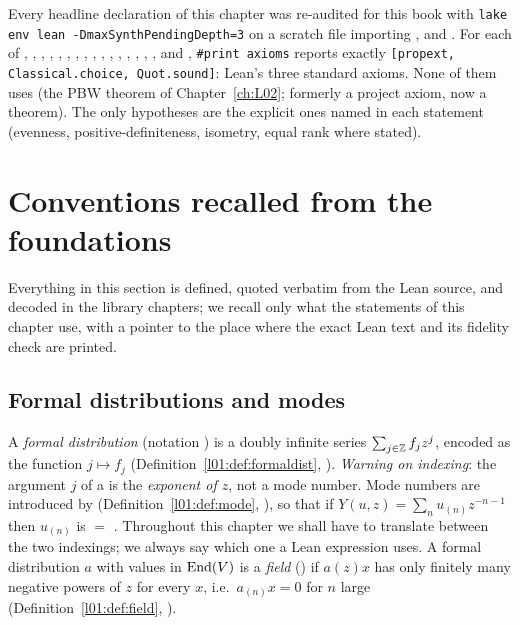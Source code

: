 \begin{status}
Every headline declaration of this chapter was re-audited for this book with
\texttt{lake env lean -DmaxSynthPendingDepth=3} on a scratch file importing
,  and
. For each of ,
, , ,
, , , ,
, , ,
, , ,
, ,  and
, \texttt{\#print axioms} reports exactly
\texttt{[propext, Classical.choice, Quot.sound]}: Lean's three standard axioms. None of them uses
 (the PBW theorem of Chapter~\ref{ch:L02}; formerly a project axiom, now a theorem). The only hypotheses are the explicit ones named in each
statement (evenness, positive-definiteness, isometry, equal rank where stated).
\end{status}

\section{Conventions recalled from the foundations}\label{ch03:sec:conventions}

Everything in this section is defined, quoted verbatim from the Lean source, and decoded in the
library chapters; we recall only what the statements of this chapter use, with a pointer to the
place where the exact Lean text and its fidelity check are printed.

\subsection{Formal distributions and modes}

A \emph{formal distribution}  (notation ) is a doubly infinite
series $\sum_{j\in{\mathbb{Z}}}f_jz^j$, encoded as the function $j\mapsto f_j$
(Definition~\ref{l01:def:formaldist}, ).
\emph{Warning on indexing}: the argument $j$ of a  is the \emph{exponent of $z$},
not a mode number. Mode numbers are introduced by 
(Definition~\ref{l01:def:mode}, ), so that if
$Y(u,z)=\sum_n u_{(n)}z^{-n-1}$ then $u_{(n)}$ is  $=$ .
Throughout this chapter we shall have to translate between the two indexings; we always say which
one a Lean expression uses. A formal distribution $a$ with values in $\operatorname{End}(V)$ is a \emph{field}
() if $a(z)x$ has only finitely many negative powers of $z$ for every $x$, i.e.\
$a_{(n)}x=0$ for $n$ large (Definition~\ref{l01:def:field}, ).

